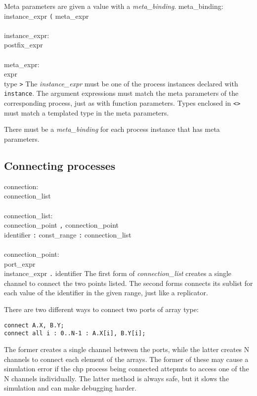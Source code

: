 Meta parameters are given a value with a {\it{}meta\_binding}.
\grammarstart
meta\_binding: \\
      \>instance\_expr {\tt{}(} meta\_expr\LIST {\tt{})} \\
 \\
instance\_expr: \\
      \>postfix\_expr \\
 \\
meta\_expr: \\
      \>expr \\
      \>{\tt{}<} type {\tt{}>}
\grammarend
The {\it{}instance\_expr} must be one of the process instances declared with
{\tt{}instance}. The argument expressions must match the meta parameters
of the corresponding process, just as with function parameters.  Types enclosed
in {\tt{}<>} must match a templated type in the meta parameters.

There must be a {\it{}meta\_binding} for each process instance that has
meta parameters.


\subsection{Connecting processes}\label{sec:connect}

\grammarstart
connection: \\
       connection\_list \\
 \\
connection\_list: \\
           connection\_point {\tt{},} connection\_point \\
\orbox {} identifier {\tt{}:} const\_range {\tt{}:} connection\_list \\
 \\
connection\_point: \\
       \>port\_expr \\
\orbox \>instance\_expr {\tt{}.} identifier
\grammarend
The first form of {\it{}connection\_list} creates a single channel to
connect the two points listed.
The second forms connects its sublist for each value of the identifier in
the given range, just like a replicator.

There are two different ways to connect two ports of array type:
\begin{verbatim}
connect A.X, B.Y;
connect all i : 0..N-1 : A.X[i], B.Y[i];
\end{verbatim}
The former creates a single channel between the ports, while the latter
creates N channels to connect each element of the arrays.  The former of
these may cause a simulation error if the chp process being connected
attepmts to access one of the N channels individually.
The latter method is always safe, but it
slows the simulation and can make debugging harder.

